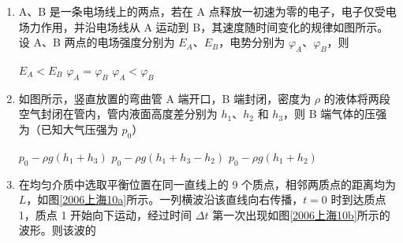 \documentclass[\gkver]{gaokaozhenti}
\begin{document}
\begin{enumerate}
{原子核内有中子存在}
{电子是原子的组成部分}
{原子核是由质子和中子组成的}


\item
A、B 是一条电场线上的两点，若在 A 点释放一初速为零的电子，电子仅受电场力作用，并沿电场线从 A 运动到 B，其速度随时间变化的规律如图所示。设 A、B 两点的电场强度分别为 $E_{A}$、$E_{B}$，电势分别为 $\varphi_{A}$、$\varphi_{B}$，则


{$E_{A}<E_{B}$}
{$\varphi_{A}=\varphi_{B}$}
{$\varphi_{A}<\varphi_{B}$}


\item
如图所示，竖直放置的弯曲管 A 端开口，B 端封闭，密度为 $\rho$ 的液体将两段空气封闭在管内，管内液面高度差分别为 $h_{1}$、$h_{2}$ 和 $h_{3}$，则 B 端气体的压强为（已知大气压强为 $p_{0}$）

\onepicture[w=4.76cm]{}

{$p_{0}-\rho g(h_{1}+h_{3})$}
{$p_{0}-\rho g(h_{1}+h_{3}-h_{2})$}
{$p_{0}-\rho g(h_{1}+h_{2})$}


\item
在均匀介质中选取平衡位置在同一直线上的 9 个质点，相邻两质点的距离均为 $L$，如图\ref{2006上海10a}所示。一列横波沿该直线向右传播，$t=0$ 时到达质点 1，质点 1 开始向下运动，经过时间 $\Delta t$ 第一次出现如图\ref{2006上海10b}所示的波形。则该波的


\end{enumerate}
\end{document}

